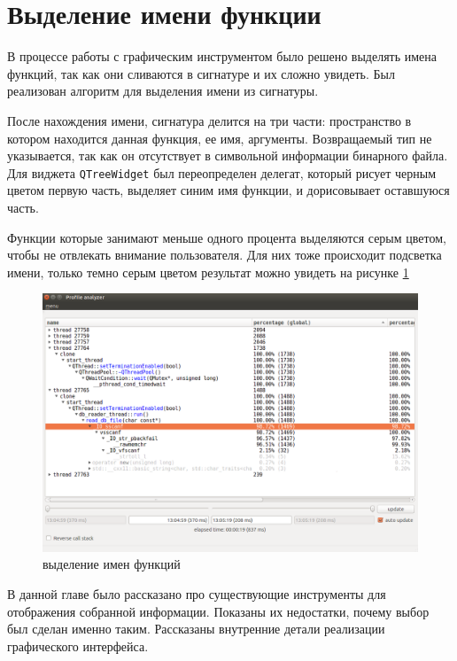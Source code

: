\section{Выделение имени функции}
	В процессе работы с графическим инструментом было решено выделять имена функций, так как они сливаются в сигнатуре и их сложно увидеть. Был реализован алгоритм для выделения имени из сигнатуры.
    
    После нахождения имени, сигнатура делится на три части: пространство в котором находится данная функция, ее имя, аргументы. Возвращаемый тип не указывается, так как он отсутствует в символьной информации бинарного файла. Для виджета \verb|QTreeWidget| был переопределен делегат, который рисует черным цветом первую часть, выделяет синим имя функции, и дорисовывает оставшуюся часть. 
    
    Функции которые занимают меньше одного процента выделяются серым цветом, чтобы не отвлекать внимание пользователя. Для них тоже происходит подсветка имени, только темно серым цветом результат можно увидеть на рисунке \ref{fig:highlighting}
    \begin{figure}[H]
        \caption{выделение имен функций}
        \label{fig:highlighting}
        \centering
        \includegraphics[scale=0.35]{images/highlighting}
    \end{figure}	
    
\chapterconclusion
	В данной главе было рассказано про существующие инструменты для отображения собранной информации. Показаны их недостатки, почему выбор был сделан именно таким. Рассказаны внутренние детали реализации графического интерфейса. 

